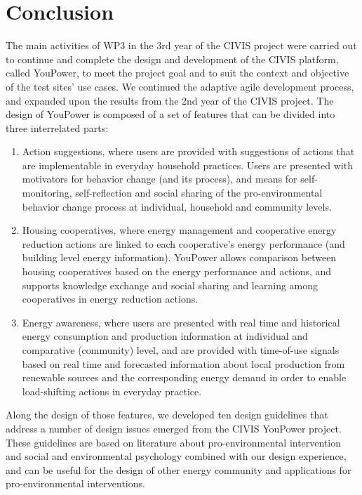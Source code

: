 \section{Conclusion}

The main activities of WP3 in the 3rd year of the CIVIS project were carried out to continue and complete the design and development of the CIVIS platform, called YouPower, to meet the project goal and to suit the context and objective of the test sites' use cases. 
We continued the adaptive agile development process, and expanded upon the results from the 2nd year of the CIVIS project. The design of YouPower is composed of a set of features that can be divided into three interrelated parts: 
\begin{enumerate}
\item Action suggestions, where users are provided with suggestions of  actions that are implementable in everyday household practices. Users are presented with motivators for behavior change (and its process), and means for self-monitoring, self-reflection and social sharing of the pro-environmental behavior change process at individual, household and community levels.

\item Housing cooperatives, where energy management and cooperative energy reduction actions are linked to each cooperative's energy performance (and building level energy information). YouPower allows comparison between housing cooperatives based on the energy performance and actions, and supports knowledge exchange and social sharing and learning among cooperatives in energy reduction actions.

\item Energy awareness, where users are presented with real time and historical energy consumption and production information at individual and comparative (community) level, and are provided with time-of-use signals based on real time and forecasted information about local production from renewable sources and the corresponding energy demand in order to enable load-shifting actions in everyday practice. 

\end{enumerate}

Along the design of those features, we developed ten design guidelines that address a number of design issues emerged from the CIVIS YouPower project. These guidelines are based on literature about pro-environmental intervention and social and environmental psychology combined with our design experience, and can be useful for the design of other energy community and applications for pro-environmental interventions. 

